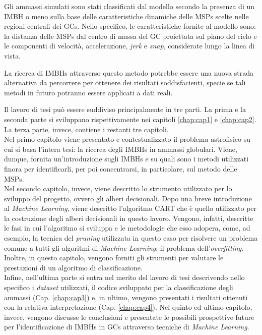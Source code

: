 Gli ammassi simulati sono stati classificati dal modello secondo la presenza di un IMBH o meno sulla base delle caratteristiche dinamiche delle MSPs scelte nelle regioni centrali dei GCs. Nello specifico, le caratteristiche fornite al modello sono: la distanza delle MSPs dal centro di massa del GC proiettata sul piano del cielo e le componenti di velocità, accelerazione, \textit{jerk} e \textit{snap}, considerate lungo la linea di vista. 

La ricerca di IMBHs attraverso questo metodo potrebbe essere una nuova strada alternativa da percorrere per ottenere dei risultati soddisfacienti, specie se tali metodi in futuro potranno essere applicati a dati reali.

Il lavoro di tesi può essere suddiviso principalmente in tre parti. La prima e la seconda parte  si sviluppano rispettivamente nei capitoli \ref{chap:cap1} e \ref{chap:cap2}. La terza parte, invece, contiene i restanti tre capitoli.\\
Nel primo capitolo viene presentato e contestualizzato il problema astrofisico su cui si basa l'intera tesi: la ricerca degli IMBHs in ammassi globulari. Viene, dunque, fornita un'introduzione sugli IMBHs e su quali sono i metodi utilizzati finora per identificarli, per poi concentrarsi, in particolare, sul metodo delle MSPs.\\
Nel secondo capitolo, invece, viene descritto lo strumento utilizzato per lo sviluppo del progetto, ovvero gli alberi decisionali. Dopo una breve introduzione al \textit{Machine Learning}, viene descritto l'algoritmo CART \cite{brei:book} che è quello utilizzato per la costruzione degli alberi decisionali in questo lavoro. Vengono, infatti, descritte le fasi in cui l'algoritmo si sviluppa e le metodologie che esso adopera, come, ad esempio, la tecnica del \textit{pruning} utilizzata in questo caso per risolvere un problema comune a tutti gli algoritmi di \textit{Machine Learning}: il problema dell'\textit{overfitting}. Inoltre, in questo capitolo, vengono forniti gli strumenti per valutare le prestazioni di un algoritmo di classificazione.\\
Infine, nell'ultima parte si entra nel merito del lavoro di tesi descrivendo nello specifico i \textit{dataset} utilizzati, il codice sviluppato per la classificazione degli ammassi (Cap. \ref{chap:cap3}) e, in ultimo, vengono presentati i risultati ottenuti con la relativa interpretazione (Cap. \ref{chap:cap4}). Nel quinto ed ultimo capitolo, invece, vengono discusse le conclusioni e presentate le possibili prospettive future per l'identificazione di IMBHs in GCs attraverso tecniche di \textit{Machine Learning}.






